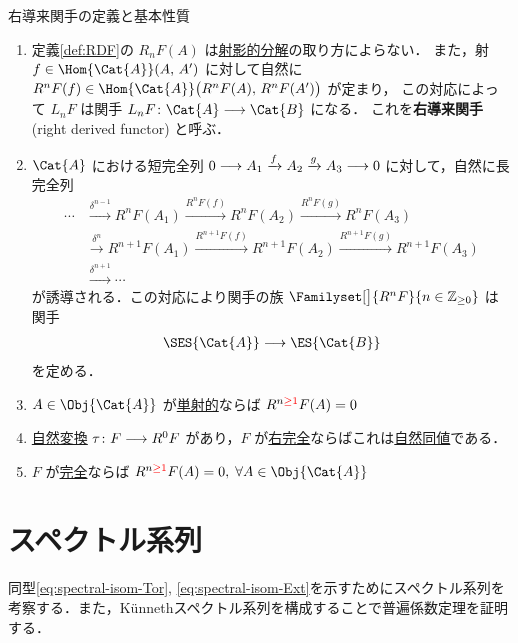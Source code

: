 \documentclass[algtopo_main]{subfiles}
\begin{document}
\begin{myprop}[label=def:RDF-basic, breakable]{右導来関手の定義と基本性質}
    \begin{enumerate}
        \item 定義\ref{def:RDF}の $R_nF(A)$ は\hyperref[def:injective-resolution]{射影的分解}の取り方によらない．
        また，射 $f \in \Hom{\Cat{A}}(A,\, A')$ に対して自然に $R^n F(f) \in \Hom{\Cat{A}}\bigl(R^nF(A),\, R^nF(A') \bigr)$ が定まり，
        この対応によって $L_n F$ は関手 $L_n F \colon \Cat{A} \lto \Cat{B}$ になる．
        これを\textbf{右導来関手} (right derived functor) と呼ぶ．
        \item $\Cat{A}$ における短完全列 $0\longrightarrow A_1 \xrightarrow{f} A_2 \xrightarrow{g} A_3 \longrightarrow 0$ に対して，自然に長完全列
        \begin{align}
            \cdots &\xrightarrow{\delta^{n-1}} R^nF(A_1) \xrightarrow{R^n F(f)} R^nF(A_2) \xrightarrow{R^nF(g)} R^nF(A_3) \\
                &\xrightarrow{\delta^{n}} R^{n+1}F(A_1) \xrightarrow{R^{n+1}F(f)} R^{n+1}F(A_2) \xrightarrow{R^{n+1}F(g)} R^{n+1}F(A_3) \\
                &\xrightarrow{\delta^{n+1}} \cdots 
        \end{align}
        が誘導される．この対応により関手の族 $\Familyset[\big]{R^nF}{n \in \mathbb{Z}_{\ge 0}}$ は関手
        \begin{align}
            \SES{\Cat{A}} \lto \ES{\Cat{B}}
        \end{align}
        を定める．
        \item $A \in \Obj{\Cat{A}}$ が\hyperref[def:inj-mod]{単射的}ならば $R^{n \textcolor{red}{\ge 1}}F(A) = 0$
        \item \hyperref[def:nat]{自然変換} $\tau\colon F \longrightarrow R^0 F$ があり，$F$ が\hyperref[def:Ab-func]{右完全}ならばこれは\hyperref[def:naturallyeq]{自然同値}である．
        \item $F$ が\hyperref[def:Ab-func]{完全}ならば $R^{n \textcolor{red}{\ge 1}}F(A) = 0,\; \forall A \in \Obj{\Cat{A}}$
    \end{enumerate}
\end{myprop}



\section{スペクトル系列}

同型\eqref{eq:spectral-isom-Tor}, \eqref{eq:spectral-isom-Ext}を示すためにスペクトル系列を考察する．また，K\"unnethスペクトル系列を構成することで普遍係数定理を証明する．
\end{document}
